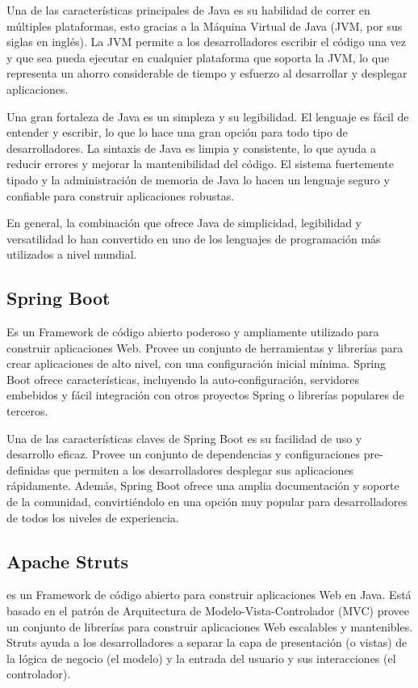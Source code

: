         Una de las características principales de Java es su habilidad de correr en múltiples plataformas, esto gracias a la Máquina Virtual de Java (JVM, por sus siglas en inglés). La JVM permite a los desarrolladores escribir el código una vez y que sea pueda ejecutar en cualquier plataforma que soporta la JVM, lo que representa un ahorro considerable de tiempo y esfuerzo al desarrollar y desplegar aplicaciones.

        Una gran fortaleza de Java es un simpleza y su legibilidad. El lenguaje es fácil de entender y escribir, lo que lo hace una gran opción para todo tipo de desarrolladores. La sintaxis de Java es limpia y consistente, lo que ayuda a reducir errores y mejorar la mantenibilidad del código. El sistema fuertemente tipado y la administración de memoria de Java lo hacen un lenguaje seguro y confiable para construir aplicaciones robustas.

        En general, la combinación que ofrece Java de simplicidad, legibilidad y versatilidad lo han convertido en uno de los lenguajes de programación más utilizados a nivel mundial. \cite{sierra2018headfirst}
        
        \subsection{Spring Boot}
            Es un Framework de código abierto poderoso y ampliamente utilizado para construir aplicaciones Web. Provee un conjunto de herramientas y librerías para crear aplicaciones de alto nivel, con una configuración inicial mínima. Spring Boot ofrece características, incluyendo la auto-configuración, servidores embebidos y fácil integración con otros proyectos Spring o librerías populares de terceros.

            Una de las características claves de Spring Boot es su facilidad de uso y desarrollo eficaz. Provee un conjunto de dependencias y configuraciones pre-definidas que permiten a los desarrolladores desplegar sus aplicaciones rápidamente. Además, Spring Boot ofrece una amplia documentación y soporte de la comunidad, convirtiéndolo en una opción muy popular para desarrolladores de todos los niveles de experiencia. \cite{wallis2019springboot}
        \subsection{Apache Struts}
            es un Framework de código abierto para construir aplicaciones Web en Java. Está basado en el patrón de Arquitectura de Modelo-Vista-Controlador (MVC) provee un conjunto de librerías para construir aplicaciones Web escalables y mantenibles. Struts ayuda a los desarrolladores a separar la capa de presentación (o vistas) de la lógica de negocio (el modelo) y la entrada del usuario y sus interacciones (el controlador).

